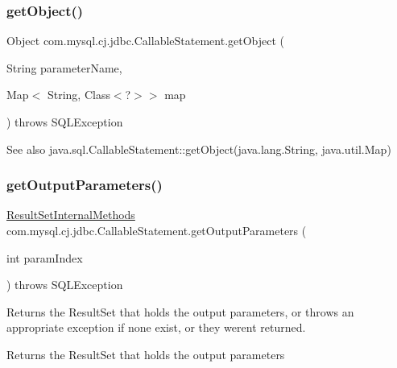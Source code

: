 \subsubsection{\texorpdfstring{get\+Object()}{getObject()}\hspace{0.1cm}{\footnotesize\ttfamily [4/4]}}
{\footnotesize\ttfamily Object com.\+mysql.\+cj.\+jdbc.\+Callable\+Statement.\+get\+Object (\begin{DoxyParamCaption}\item[{String}]{parameter\+Name,  }\item[{Map$<$ String, Class$<$?$>$$>$}]{map }\end{DoxyParamCaption}) throws S\+Q\+L\+Exception}

\begin{DoxySeeAlso}{See also}
java.\+sql.\+Callable\+Statement\+::get\+Object(java.\+lang.\+String, java.\+util.\+Map) 
\end{DoxySeeAlso}
\mbox{\label{classcom_1_1mysql_1_1cj_1_1jdbc_1_1_callable_statement_af73a9e62e30b97e9b02f519a09749fbf}} 
\subsubsection{\texorpdfstring{get\+Output\+Parameters()}{getOutputParameters()}}
{\footnotesize\ttfamily \mbox{\hyperlink{interfacecom_1_1mysql_1_1cj_1_1jdbc_1_1result_1_1_result_set_internal_methods}{Result\+Set\+Internal\+Methods}} com.\+mysql.\+cj.\+jdbc.\+Callable\+Statement.\+get\+Output\+Parameters (\begin{DoxyParamCaption}\item[{int}]{param\+Index }\end{DoxyParamCaption}) throws S\+Q\+L\+Exception\hspace{0.3cm}{\ttfamily [protected]}}

Returns the Result\+Set that holds the output parameters, or throws an appropriate exception if none exist, or they weren\textquotesingle{}t returned.

\begin{DoxyReturn}{Returns}
the Result\+Set that holds the output parameters
\end{DoxyReturn}

